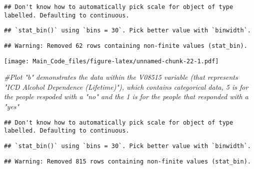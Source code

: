 \documentclass[]{article}
\newenvironment{Shaded}{\begin{snugshade}}{\end{snugshade}}
\newcommand{\KeywordTok}[1]{\textcolor[rgb]{0.13,0.29,0.53}{\textbf{#1}}}
\newcommand{\DecValTok}[1]{\textcolor[rgb]{0.00,0.00,0.81}{#1}}
\newcommand{\StringTok}[1]{\textcolor[rgb]{0.31,0.60,0.02}{#1}}
\newcommand{\CommentTok}[1]{\textcolor[rgb]{0.56,0.35,0.01}{\textit{#1}}}
\newcommand{\OperatorTok}[1]{\textcolor[rgb]{0.81,0.36,0.00}{\textbf{#1}}}
\newcommand{\NormalTok}[1]{#1}
\begin{document}
\begin{verbatim}
## Don't know how to automatically pick scale for object of type labelled. Defaulting to continuous.
\end{verbatim}

\begin{verbatim}
## `stat_bin()` using `bins = 30`. Pick better value with `binwidth`.
\end{verbatim}

\begin{verbatim}
## Warning: Removed 62 rows containing non-finite values (stat_bin).
\end{verbatim}

\texttt{[image: Main\_Code\_files/figure-latex/unnamed-chunk-22-1.pdf]}

\begin{Shaded}
\begin{Highlighting}[]
\CommentTok{#Plot "b" demonstrates the data within the V08515 variable (that represents "ICD Alcohol Dependence (Lifetime)"), which contains categorical data, 5 is for the people respoded with a "no" and the 1 is for the people that responded with a "yes"}
\end{Highlighting}
\end{Shaded}

\begin{Shaded}
\end{Shaded}

\begin{verbatim}
## Don't know how to automatically pick scale for object of type labelled. Defaulting to continuous.
\end{verbatim}

\begin{verbatim}
## `stat_bin()` using `bins = 30`. Pick better value with `binwidth`.
\end{verbatim}

\begin{verbatim}
## Warning: Removed 815 rows containing non-finite values (stat_bin).
\end{verbatim}
\end{document}
